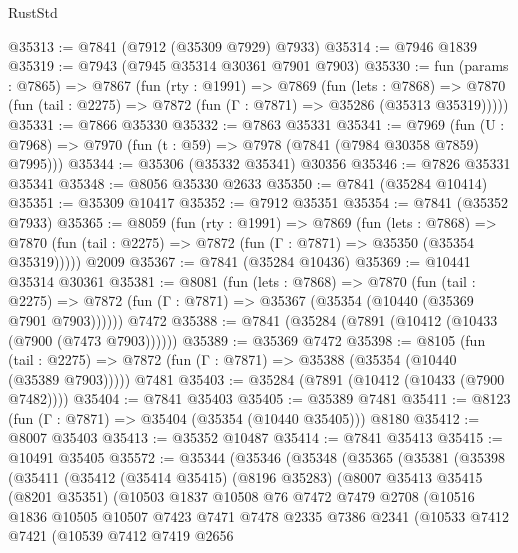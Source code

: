\begin{lexlean}{RustStd}
\begin{coremodule}
{\begin{coremodule}
{{{{{{{{{{{{{{{{{{{{{{{{{{{{{{{{{{{{{{{{{{{{{{{{{{{{{{@35313 := @7841 (@7912 (@35309 @7929) @7933)
@35314 := @7946 @1839
@35319 := @7943 (@7945 @35314 @30361 @7901 @7903)
@35330 := fun (params : @7865) =>
  @7867
    (fun (rty : @1991) =>
    @7869
      (fun (lets : @7868) =>
      @7870 (fun (tail : @2275) => @7872 (fun (Γ : @7871) => @35286 (@35313 @35319)))))
@35331 := @7866 @35330
@35332 := @7863 @35331
@35341 := @7969
    (fun (U : @7968) => @7970 (fun (t : @59) => @7978 (@7841 (@7984 @30358 @7859) @7995)))
@35344 := @35306 (@35332 @35341) @30356
@35346 := @7826 @35331 @35341
@35348 := @8056 @35330 @2633
@35350 := @7841 (@35284 @10414)
@35351 := @35309 @10417
@35352 := @7912 @35351
@35354 := @7841 (@35352 @7933)
@35365 := @8059
    (fun (rty : @1991) =>
    @7869
      (fun (lets : @7868) =>
      @7870 (fun (tail : @2275) => @7872 (fun (Γ : @7871) => @35350 (@35354 @35319)))))
    @2009
@35367 := @7841 (@35284 @10436)
@35369 := @10441 @35314 @30361
@35381 := @8081
    (fun (lets : @7868) =>
    @7870
      (fun (tail : @2275) =>
      @7872 (fun (Γ : @7871) => @35367 (@35354 (@10440 (@35369 @7901 @7903))))))
    @7472
@35388 := @7841 (@35284 (@7891 (@10412 (@10433 (@7900 (@7473 @7903))))))
@35389 := @35369 @7472
@35398 := @8105
    (fun (tail : @2275) => @7872 (fun (Γ : @7871) => @35388 (@35354 (@10440 (@35389 @7903)))))
    @7481
@35403 := @35284 (@7891 (@10412 (@10433 (@7900 @7482))))
@35404 := @7841 @35403
@35405 := @35389 @7481
@35411 := @8123 (fun (Γ : @7871) => @35404 (@35354 (@10440 @35405))) @8180
@35412 := @8007 @35403
@35413 := @35352 @10487
@35414 := @7841 @35413
@35415 := @10491 @35405
@35572 := @35344
    (@35346
      (@35348
        (@35365
          (@35381
            (@35398
              (@35411
                (@35412
                  (@35414 @35415)
                  (@8196 @35283)
                  (@8007
                    @35413
                    @35415
                    (@8201 @35351)
                    (@10503
                      @1837
                      @10508
                      @76
                      @7472
                      @7479
                      @2708
                      (@10516
                        @1836
                        @10505
                        @10507
                        @7423
                        @7471
                        @7478
                        @2335
                        @7386
                        @2341
                        (@10533
                          @7412
                          @7421
                          (@10539
                            @7412
                            @7419
                            @2656
}}}}}}}}}}}}}}}}}}}}}}}}}}}}}}}}}}}}}}}}}}}}}}}}}}}}}}
\end{coremodule}}
\end{coremodule}
\end{lexlean}
